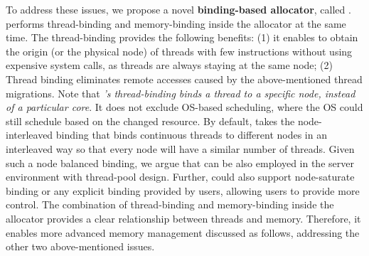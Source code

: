 To address these issues, we propose a novel \textbf{binding-based allocator}, called \NM{}.
\NM{} performs thread-binding and memory-binding inside the allocator at the same time. The thread-binding provides the following benefits: (1) it enables \NM{} to obtain the origin (or the physical node) of threads with few instructions without using expensive system calls, as threads are always staying at the same node; (2) Thread binding eliminates remote accesses caused by the above-mentioned thread migrations. Note that \textit{\NM{}'s thread-binding binds a thread to a specific node, instead of a particular core}. It does not exclude OS-based scheduling, where the OS could still schedule based on the changed resource. By default, \NM{} takes the node-interleaved binding that binds continuous threads to different nodes in an interleaved way so that every node will have a similar number of threads. Given such a node balanced binding, we argue that \NM{} can be also employed in the server environment with thread-pool design.
Further, \NM{} could also support node-saturate binding or any explicit binding provided by users, allowing users to provide more control. The combination of thread-binding and memory-binding inside the allocator provides a clear relationship between threads and memory. Therefore, it enables more advanced memory management discussed as follows, addressing the other two above-mentioned issues. 



